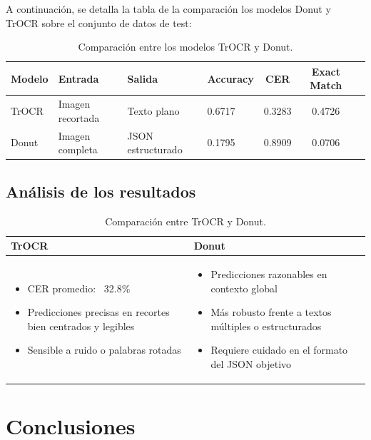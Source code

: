 \documentclass[12pt]{article}
\begin{document}
A continuación, se detalla la tabla de la comparación los modelos Donut y TrOCR sobre el conjunto de datos de test:
\begin{table}[h!]
\centering
\begin{tabular}{|l|l|l|l|c|c|c|}
\hline
\textbf{Modelo}  & \textbf{Entrada} & \textbf{Salida} & 
\textbf{Accuracy} & \textbf{CER} & \textbf{Exact Match} \\
\hline
TrOCR & Imagen recortada & Texto plano & 0.6717 & 0.3283 & 0.4726 \\
Donut & Imagen completa & JSON estructurado & 0.1795 & 0.8909 & 0.0706 \\
\hline
\end{tabular}
\caption{Comparación entre los modelos TrOCR y Donut.}
\label{tab:model-comparison}
\end{table}


\subsection{Análisis de los resultados}

\begin{table}[h!]
\centering
\begin{tabular}{|p{6cm}|p{6cm}|}
\hline
\textbf{TrOCR} & \textbf{Donut} \\
\hline
\begin{itemize}
    \item CER promedio: ~32.8\%
    \item Predicciones precisas en recortes bien centrados y legibles
    \item Sensible a ruido o palabras rotadas
\end{itemize}
&
\begin{itemize}
    \item Predicciones razonables en contexto global
    \item Más robusto frente a textos múltiples o estructurados
    \item Requiere cuidado en el formato del JSON objetivo
\end{itemize}
\\
\hline
\end{tabular}
\caption{Comparación entre TrOCR y Donut.}
\label{tab:ventajas}
\end{table}


\section{Conclusiones}
\end{document}
